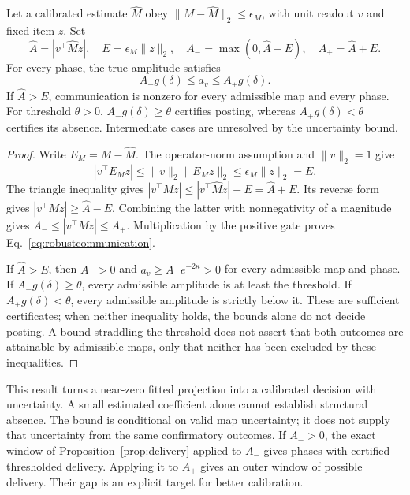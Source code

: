 \documentclass[submission,nolinenumbers]{esj}
\begin{document}
\begin{proposition}\label{prop:robustcommunication}
Let a calibrated estimate $\widehat M$ obey $\|M-\widehat M\|_2\le\epsilon_M$, with unit readout $v$ and fixed item $z$. Set
\[
\widehat A=|v^\top\widehat Mz|,\quad E=\epsilon_M\|z\|_2,
\quad A_- =\max(0,\widehat A-E),\quad A_+=\widehat A+E.
\]
For every phase, the true amplitude satisfies
\begin{equation}
A_-g(\delta)\le a_v\le A_+g(\delta).\label{eq:robustcommunication}
\end{equation}
If $\widehat A>E$, communication is nonzero for every admissible map and every phase. For threshold $\theta>0$, $A_-g(\delta)\ge\theta$ certifies posting, whereas $A_+g(\delta)<\theta$ certifies its absence. Intermediate cases are unresolved by the uncertainty bound.
\end{proposition}
\begin{proof}
Write $E_M=M-\widehat M$. The operator-norm assumption and $\|v\|_2=1$ give
\[
|v^\top E_Mz|\le\|v\|_2\|E_Mz\|_2\le\epsilon_M\|z\|_2=E.
\]
The triangle inequality gives $|v^\top Mz|\le|v^\top\widehat Mz|+E=\widehat A+E$. Its reverse form gives $|v^\top Mz|\ge\widehat A-E$. Combining the latter with nonnegativity of a magnitude gives $A_-\le|v^\top Mz|\le A_+$. Multiplication by the positive gate proves Eq.~\eqref{eq:robustcommunication}.

If $\widehat A>E$, then $A_->0$ and $a_v\ge A_-e^{-2\kappa}>0$ for every admissible map and phase. If $A_-g(\delta)\ge\theta$, every admissible amplitude is at least the threshold. If $A_+g(\delta)<\theta$, every admissible amplitude is strictly below it. These are sufficient certificates; when neither inequality holds, the bounds alone do not decide posting. A bound straddling the threshold does not assert that both outcomes are attainable by admissible maps, only that neither has been excluded by these inequalities.
\end{proof}
This result turns a near-zero fitted projection into a calibrated decision with uncertainty. A small estimated coefficient alone cannot establish structural absence. The bound is conditional on valid map uncertainty; it does not supply that uncertainty from the same confirmatory outcomes. If $A_->0$, the exact window of Proposition~\ref{prop:delivery} applied to $A_-$ gives phases with certified thresholded delivery. Applying it to $A_+$ gives an outer window of possible delivery. Their gap is an explicit target for better calibration.
\end{document}
